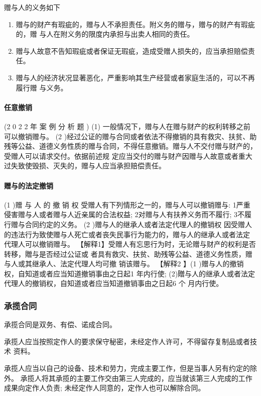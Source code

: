 \documentclass[UTF8,12pt]{ctexart}
\numberwithin{equation}{section} %
\numberwithin{figure}{section}
\numberwithin{table}{section}
\begin{document}
	赠与人的义务如下
	\begin{enumerate}
		\item 赠与的财产有瑕疵的，赠与人不承担责任。附义务的赠与，赠与的财产有瑕疵的，赠 与人在附义务的限度内承担与出卖人相同的责任。
		
		\item 赠与人故意不告知瑕疵或者保证无瑕疵，造成受赠人损失的，应当承担赔偿责任。
		
		\item 赠与人的经济状况显著恶化，严重影响其生产经营或者家庭生活的，可以不再履行赠 与义务。
	\end{enumerate}
	
	\paragraph{任意撤销} (2 0 2 2 年 案 例 分 析 题 )
	(1) 一般情况下，赠与人在赠与财产的权利转移之前可以撤销赠与。
	(2 )经过公证的赠与合同或者依法不得撤销的具有救灾、扶贫、助残等公益、道德义务性质的赠与合同，不得任意撤销。赠与人不交付赠与财产的，受赠人可以请求交付。依据前述规 定应当交付的赠与财产因赠与人故意或者重大过失致使毁损、灭失的，赠与人应当承担赔偿责任。
	
	\paragraph{赠与的法定撤销} 
	(1 )赠 与 人 的 撤 销 权
	受赠人有下列情形之一的，赠与人可以撤销赠与: 1严重侵害赠与人或者赠与人近亲属的合法权益;
	2对赠与人有扶养义务而不履行;
	3不履行赠与合同约定的义务。
	(2 )赠与人的继承人或者法定代理人的撤销权 因受赠人的违法行为致使赠与人死亡或者丧失民事行为能力的，赠与人的继承人或者法定 代理人可以撤销赠与。
	【解释1】受赠人有忘思行为时，无论赠与财产的权利是否转移，贈与是否经过公证或 者具有救灾、扶贫、助残等公益、道德义务性质，赠与人或其继承人、法定代理人均可撤 销该赠与。
	【解释2 】(1 )赠与人的撤销权，自知道或者应当知道撤销事由之日起1 年内行使; (2)贈与人的继承人或者法定代理人的撤销权，自知道或者应当知道撤销事由之日起6 个 月内行使。
	
	
	\subsubsection{承揽合同}
	
	
	承揽合同是双务、有偿、诺成合同。
	
	承揽人应当按照定作人的要求保守秘密，未经定作人许可，不得留存复制品或者技术 资料。
	
	承揽人应当以自己的设备、技术和劳力，完成主要工作，但是当事人另有约定的除外。 承揽人将其承揽的主要工作交由第三人完成的，应当就该第三人完成的工作成果向定作人负责; 未经定作人同意的，定作人也可以解除合同。
	
\end{document}
